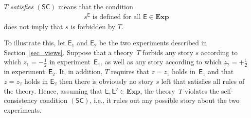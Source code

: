 \documentclass{article}
\theoremstyle{plain}
\theoremstyle{definition}
\newcommand*{\cE}{\mathcal{E}}
\newcommand*{\Exp}{\mathsf{E}}
\newcommand*{\Expp}{\mathsf{E'}}
\newcommand*{\Expone}{\mathsf{E}_1}
\newcommand*{\Exptwo}{\mathsf{E}_2}
\newcommand*{\allExp}{\mathbf{Exp}}
\newcommand*{\sminus}{{\textstyle - \frac{1}{2}}}
\newcommand*{\splus}{{\textstyle + \frac{1}{2}}}
\newcommand*{\SelfCons}{\mathsf{(SC)}}
\begin{document}
\begin{shaded}
  \noindent \emph{$T$ satisfies $\SelfCons$} means that the condition  
  \begin{align*}
      s^{\Exp} \text{ is defined for all }   \Exp \in \allExp 
  \end{align*}
  does not imply that $s$ is forbidden by $T$. 
\end{shaded}


To illustrate this, let $\Expone$ and $\Exptwo$ be the two experiments described in Section~\ref{sec_views}. Suppose that a theory~$T$ forbids any story $s$ according to which $z_1 = \sminus$ in experiment~$\Expone$, as well as any story according to which $z_2 = \splus$ in experiment~$\Exptwo$. If, in addition, $T$ requires that $z = z_1$ holds in~$\Expone$ and that $z = z_2$ holds in $\Exptwo$ then there is obviously no story $s$ left that satisfies all rules of the theory.  Hence, assuming that $\Exp, \Expp \in \allExp$, the theory~$T$ violates the self-consistency condition $\SelfCons$, i.e., it rules out any possible story about the two experiments.




%
\end{document}

